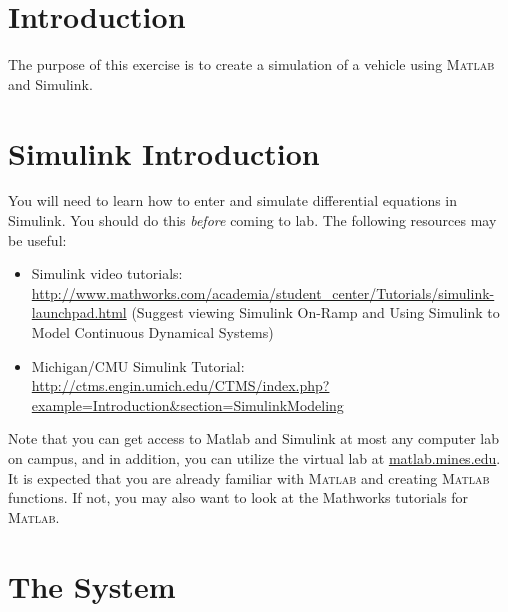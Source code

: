 





\begin{frame}
  \titlepage
\end{frame}



\section{Introduction}
The purpose of this exercise is to create a simulation of a vehicle using \textsc{Matlab} and Simulink. 

\section{Simulink Introduction}

You will need to learn how to enter and simulate differential equations in Simulink. You should do this {\em before} coming to lab. The following resources may be useful:
\begin{itemize}
\item Simulink video tutorials: \url{http://www.mathworks.com/academia/student_center/Tutorials/simulink-launchpad.html} (Suggest viewing Simulink On-Ramp and Using Simulink to Model Continuous Dynamical Systems)
\item Michigan/CMU Simulink Tutorial: \url{http://ctms.engin.umich.edu/CTMS/index.php?example=Introduction&section=SimulinkModeling}
\end{itemize}
Note that you can get access to Matlab and Simulink at most any computer lab on campus, and in addition, you can utilize the virtual lab at \url{matlab.mines.edu}. It is expected that you are already familiar with \textsc{Matlab} and creating \textsc{Matlab} functions. If not, you may also want to look at the Mathworks tutorials for \textsc{Matlab}.

\section{The System}

